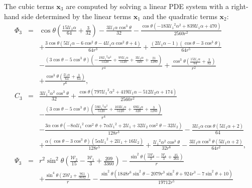 \documentclass[final]{elsarticle}
\newcommand\bx{\boldsymbol{x}}
\newcommand\cU{\mathscr{U}}
\newcommand\cW{\mathscr{W}}
\begin{document}
The cubic terms $\bx_3$ are computed by solving a linear PDE system 
with a right-hand side determined by the linear terms $\bx_1$ and the quadratic terms $\bx_2$:
\begin{eqnarray*}
\varPhi_3 &=& \cos\theta \left(\frac{15 \cU_1\alpha}{64} + \frac{3}{32}\right) - \frac{3 \cU_1\alpha {\cos}^3\theta}{32} - \frac{\cos\theta \left( - 183 {\cU_1}^2\alpha^2 + 839 \cU_1\alpha + 470\right)}{2560 r^2} \\ 
&&+ \frac{3 \cos\theta \left(5 \cU_1\alpha - 6 {\cos^2\theta} - 4 \cU_1\alpha {\cos^2\theta} + 4\right)}{64 r^3} + \frac{\left(2 \cU_1\alpha - 1\right) \left(\cos\theta - 3 {\cos}^3\theta\right)}{64 r^5} 
\\ 
&&- \frac{\left(3 \cos\theta - 5 {\cos}^3\theta\right) \left( - \frac{19 {\cU_1}^2\alpha^2}{5120} + \frac{97 \cU_1\alpha}{5120} + \frac{3 \cU_2\alpha}{320} + \frac{21}{1280}\right)}{r^4} + \frac{{\cos}^3\theta \left(\frac{15 \cU_1\alpha}{64} + \frac{3}{32}\right)}{r^2} \\ 
&&+ \frac{{\cos}^3\theta \left(\frac{\cU_1\alpha}{64} + \frac{3}{64}\right)}{r^6},
\\
C_3 &=&
\frac{3 {{\cU_1}}^2\alpha^2 {\cos^3\theta}}{32} + \frac{\cos\theta \left(797 {{\cU_1}}^2\alpha^2 + 419 {\cU_1}\alpha - 512 {\cU_2}\alpha + 174\right)}{2560 r^2} \\
&&- \frac{\left(3 \cos\theta - 5 {\cos^3\theta}\right) \left(\frac{59 {{\cU_1}}^2\alpha^2}{5120} + \frac{103 {\cU_1}\alpha}{5120} + \frac{69 {\cU_2}\alpha}{320} + \frac{3}{1280}\right)}{r^4} \\
&&- \frac{3\alpha \cos\theta \left( - 8\alpha {{\cU_1}}^2 {\cos^2\theta} + 7\alpha {{\cU_1}}^2 + 2 {\cU_1} + 32 {\cU_2} {\cos^2\theta} - 32 {\cU_2}\right)}{128 r^3} - \frac{3 {\cU_1}\alpha \cos\theta \left(5 {\cU_1}\alpha + 2\right)}{64} \\
&&+ \frac{\alpha \left(\cos\theta - 3 {\cos^3\theta}\right) \left(5\alpha {{\cU_1}}^2 + 2 {\cU_1} + 16 {\cU_2}\right)}{128 r^5} + \frac{{{\cU_1}}^2\alpha^2 {\cos^3\theta}}{32 r^6} - \frac{3 {\cU_1}\alpha {\cos^3\theta} \left(5 {\cU_1}\alpha + 2\right)}{64 r^2},
\\
\Psi_3 &=&
r^2 {\sin^2\theta} \left(\frac{{\cW_2}}{15} - \frac{{\cW_1}}{3} + \frac{209}{3360}\right) 
 - \frac{{\sin^2\theta} \left(\frac{5 {\cW_2}}{3} - \frac{{\cW_1}}{3} + \frac{35}{264}\right)}{r}
\\ && + \frac{{\sin^4\theta} \left(2 {\cW_2} + \frac{761}{5632}\right)}{r} - \frac{{\sin^2\theta} \left(1848 r^6 {\sin^2\theta} - 2079 r^3 {\sin^2\theta} + 924 r^3 - 7 {\sin^2\theta} + 10\right)}{19712 r^5} 

\end{eqnarray*}
\end{document}
